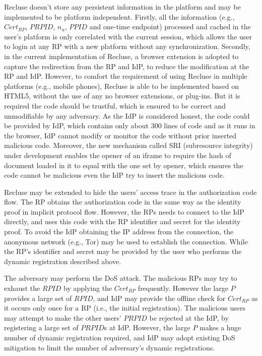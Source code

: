  Recluse doesn't store any persistent information in the platform and may be implemented to be platform independent. Firstly, all the information (e.g., $Cert_{RP}$, $PRPID$, $n_u$, $PPID$ and one-time endpoint) processed and cached in the user's platform is only correlated with the current session, which allows the user to login at any RP with a new platform without any synchronization. Secondly, in the current implementation of Recluse, a browser extension is adopted to capture the redirection from the RP and IdP, to reduce the modification at the RP and IdP.
However, to comfort the requirement of using Recluse in multiple platforms (e.g., mobile phones), Recluse is able to be implemented based on HTML5, without the use of any no browser extensions, or plug-ins. But it is required the code should be trustful, which is ensured to be correct and unmodifiable by any adversary. As the IdP is considered honest, the code could be provided by IdP, which contains only about 300 lines of code and as it runs in the browser, IdP cannot modify or monitor the code without prior inserted malicious code. Moreover, the new mechanism called SRI (subresource integrity) under development enables the opener of an iframe to require the hash of document loaded in it to equal with the one set by opener, which ensures the code cannot be malicious even the IdP try to insert the malicious code. 


 Recluse may be extended to hide the users' access trace in  the authorization code flow. The RP obtains the authorization code in the same way as the  identity proof in implicit protocol flow. However, the RPs needs to connect to the IdP directly, and  uses this code with  the RP identifier and secret for the identity proof. To avoid the IdP obtaining the IP address from the connection, the anonymous network (e.g., Tor) may be used to establish the connection. While the RP's identifier and secret may be provided by the user who performs the dynamic registration described above.

 The adversary may perform the DoS attack. The malicious RPs may try to exhaust the $RPID$  by applying the $Cert_{RP}$ frequently. However the large $P$ provides a large set of $RPID$, and IdP may provide the offline check for $Cert_{RP}$ as it occurs only once for a RP (i.e., the initial registration). The malicious users may attempt to make the other users' $PRPID$ be rejected at the IdP, by registering a large set of $PRPID$s at IdP. However, the large $P$ makes a huge number of dynamic registration required, and IdP may adopt existing DoS mitigation  to limit the number of adversary's dynamic registrations. 

